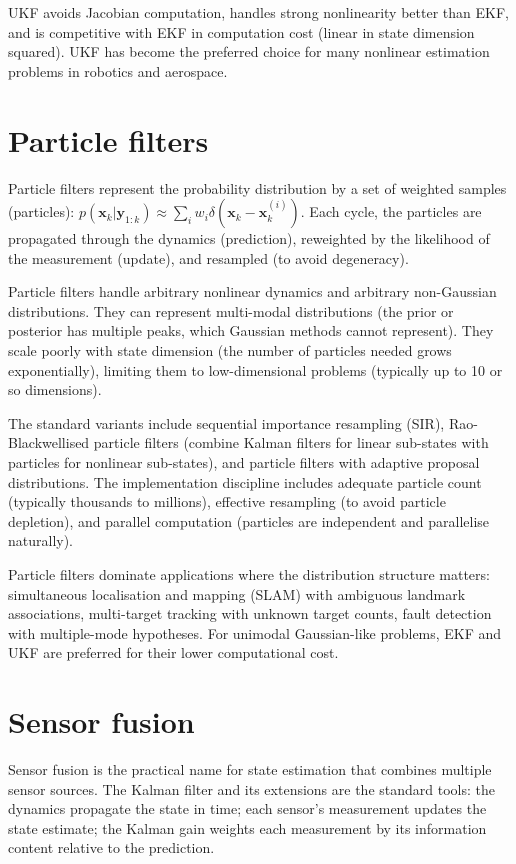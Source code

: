 UKF avoids Jacobian computation, handles strong nonlinearity better than EKF, and is competitive with EKF in computation cost (linear in state dimension squared). UKF has become the preferred choice for many nonlinear estimation problems in robotics and aerospace.

\section{Particle filters}

Particle filters represent the probability distribution by a set of weighted samples (particles): $p(\mathbf{x}_k | \mathbf{y}_{1:k}) \approx \sum_i w_i \delta(\mathbf{x}_k - \mathbf{x}_k^{(i)})$. Each cycle, the particles are propagated through the dynamics (prediction), reweighted by the likelihood of the measurement (update), and resampled (to avoid degeneracy).

Particle filters handle arbitrary nonlinear dynamics and arbitrary non-Gaussian distributions. They can represent multi-modal distributions (the prior or posterior has multiple peaks, which Gaussian methods cannot represent). They scale poorly with state dimension (the number of particles needed grows exponentially), limiting them to low-dimensional problems (typically up to 10 or so dimensions).

The standard variants include sequential importance resampling (SIR), Rao-Blackwellised particle filters (combine Kalman filters for linear sub-states with particles for nonlinear sub-states), and particle filters with adaptive proposal distributions. The implementation discipline includes adequate particle count (typically thousands to millions), effective resampling (to avoid particle depletion), and parallel computation (particles are independent and parallelise naturally).

Particle filters dominate applications where the distribution structure matters: simultaneous localisation and mapping (SLAM) with ambiguous landmark associations, multi-target tracking with unknown target counts, fault detection with multiple-mode hypotheses. For unimodal Gaussian-like problems, EKF and UKF are preferred for their lower computational cost.

\section{Sensor fusion}

Sensor fusion is the practical name for state estimation that combines multiple sensor sources. The Kalman filter and its extensions are the standard tools: the dynamics propagate the state in time; each sensor's measurement updates the state estimate; the Kalman gain weights each measurement by its information content relative to the prediction.

